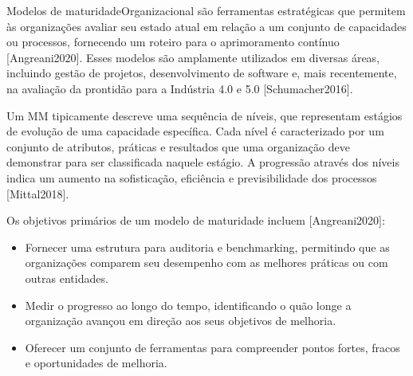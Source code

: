 \begin{comment}
\subsubsection{Modelos de Yang (2024) e Toth (2023)}
\subsection{Limitações identificadas quanto à aplicabilidade e objetividade}

\section{Critérios para Avaliação de Maturidade na Indústria 5.0}
\subsection{Identificação dos Critérios Relevantes}
\subsection{Classificação e Natureza dos Critérios(qualitativos, quantitativos, subjetivos)}
\end{comment}

Modelos de \gls{maturidadeOrganizacional} são ferramentas estratégicas que permitem às organizações avaliar seu estado atual em relação a um conjunto de capacidades ou processos, fornecendo um roteiro para o aprimoramento contínuo [Angreani2020]. Esses modelos são amplamente utilizados em diversas áreas, incluindo gestão de projetos, desenvolvimento de software e, mais recentemente, na avaliação da prontidão para a Indústria 4.0 e 5.0 [Schumacher2016].

Um MM tipicamente descreve uma sequência de níveis, que representam estágios de evolução de uma capacidade específica. Cada nível é caracterizado por um conjunto de atributos, práticas e resultados que uma organização deve demonstrar para ser classificada naquele estágio. A progressão através dos níveis indica um aumento na sofisticação, eficiência e previsibilidade dos processos [Mittal2018].

Os objetivos primários de um modelo de maturidade incluem [Angreani2020]:
\begin{itemize}
    \item Fornecer uma estrutura para auditoria e benchmarking, permitindo que as organizações comparem seu desempenho com as melhores práticas ou com outras entidades.
    \item Medir o progresso ao longo do tempo, identificando o quão longe a organização avançou em direção aos seus objetivos de melhoria.
    \item Oferecer um conjunto de ferramentas para compreender pontos fortes, fracos e oportunidades de melhoria.
\end{itemize}

